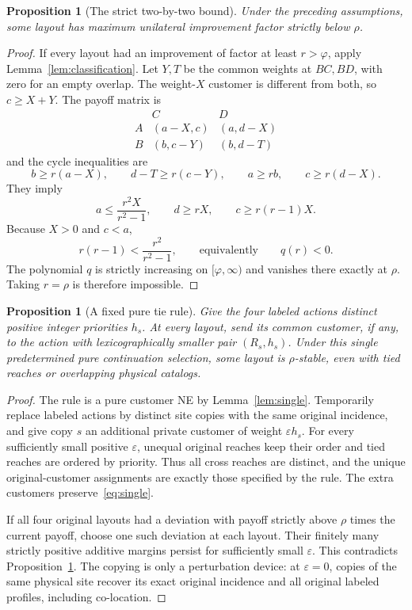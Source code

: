 \documentclass[11pt]{article}
\newtheorem{proposition}[theorem]{Proposition}
\theoremstyle{definition}
\theoremstyle{remark}
\newcommand{\phiG}{\varphi}
\newcommand{\rhoG}{\rho}
\begin{document}
\begin{proposition}[The strict two-by-two bound]\label{prop:strict-rho}
Under the preceding assumptions, some layout has maximum unilateral improvement factor strictly below $\rhoG$.
\end{proposition}
\begin{proof}
If every layout had an improvement of factor at least $r>\phiG$, apply Lemma~\ref{lem:classification}. Let $Y,T$ be the common weights at $BC,BD$, with zero for an empty overlap. The weight-$X$ customer is different from both, so $c\ge X+Y$. The payoff matrix is
\[
\begin{array}{c|cc}
 &C&D\\ \hline
 A&(a-X,c)&(a,d-X)\\
 B&(b,c-Y)&(b,d-T)
\end{array}
\]
and the cycle inequalities are
\[
 b\ge r(a-X),\qquad d-T\ge r(c-Y),\qquad
 a\ge rb,\qquad c\ge r(d-X).
\]
They imply
\[
 a\le\frac{r^2X}{r^2-1},\qquad d\ge rX,\qquad
 c\ge r(r-1)X.
\]
Because $X>0$ and $c<a$,
\[
 r(r-1)<\frac{r^2}{r^2-1},
 \qquad\text{equivalently}\qquad q(r)<0.
\]
The polynomial $q$ is strictly increasing on $[\phiG,\infty)$ and vanishes there exactly at $\rhoG$. Taking $r=\rhoG$ is therefore impossible.
\end{proof}

\begin{proposition}[A fixed pure tie rule]\label{prop:tie}
Give the four labeled actions distinct positive integer priorities $h_s$. At every layout, send its common customer, if any, to the action with lexicographically smaller pair $(R_s,h_s)$. Under this single predetermined pure continuation selection, some layout is $\rhoG$-stable, even with tied reaches or overlapping physical catalogs.
\end{proposition}
\begin{proof}
The rule is a pure customer NE by Lemma~\ref{lem:single}. Temporarily replace labeled actions by distinct site copies with the same original incidence, and give copy $s$ an additional private customer of weight $\varepsilon h_s$. For every sufficiently small positive $\varepsilon$, unequal original reaches keep their order and tied reaches are ordered by priority. Thus all cross reaches are distinct, and the unique original-customer assignments are exactly those specified by the rule. The extra customers preserve~\eqref{eq:single}.

If all four original layouts had a deviation with payoff strictly above $\rhoG$ times the current payoff, choose one such deviation at each layout. Their finitely many strictly positive additive margins persist for sufficiently small $\varepsilon$. This contradicts Proposition~\ref{prop:strict-rho}. The copying is only a perturbation device: at $\varepsilon=0$, copies of the same physical site recover its exact original incidence and all original labeled profiles, including co-location.
\end{proof}
\end{document}
